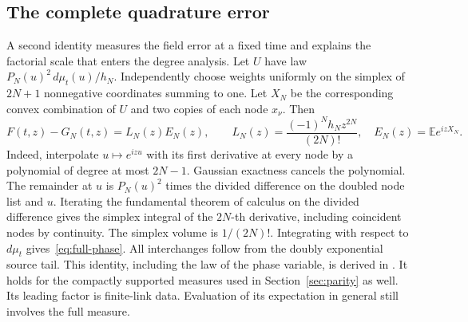 \subsection{The complete quadrature error}
A second identity measures the field error at a fixed time and explains the factorial scale that enters the degree analysis. Let \(U\) have law \(P_N(u)^2\,d\mu_t(u)/h_N\). Independently choose weights uniformly on the simplex of \(2N+1\) nonnegative coordinates summing to one. Let \(X_N\) be the corresponding convex combination of \(U\) and two copies of each node \(x_\nu\). Then
\begin{equation}
 F(t,z)-G_N(t,z)=L_N(z)E_N(z),\qquad
 L_N(z)=\frac{(-1)^Nh_Nz^{2N}}{(2N)!},\quad E_N(z)=\mathbb E e^{izX_N}.
 \label{eq:full-phase}
\end{equation}
Indeed, interpolate \(u\mapsto e^{izu}\) with its first derivative at every node by a polynomial of degree at most \(2N-1\). Gaussian exactness cancels the polynomial. The remainder at \(u\) is \(P_N(u)^2\) times the divided difference on the doubled node list and \(u\). Iterating the fundamental theorem of calculus on the divided difference gives the simplex integral of the \(2N\)-th derivative, including coincident nodes by continuity. The simplex volume is \(1/(2N)!\). Integrating with respect to \(d\mu_t\) gives~\eqref{eq:full-phase}. All interchanges follow from the doubly exponential source tail. This identity, including the law of the phase variable, is derived in \cite{vcd}. It holds for the compactly supported measures used in Section~\ref{sec:parity} as well. Its leading factor is finite-link data. Evaluation of its expectation in general still involves the full measure.
